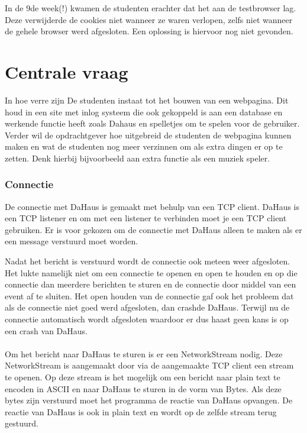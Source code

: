 \documentclass[11pt]{article}
\begin{document}
	In de 9de week(!) kwamen de studenten erachter dat het aan de testbrowser lag. Deze verwijderde de cookies niet wanneer ze waren verlopen, zelfs niet wanneer de gehele browser werd afgesloten. Een oplossing is hiervoor nog niet gevonden.
	
\newpage
	
	\section{Centrale vraag}
	In hoe verre zijn De studenten instaat tot het bouwen van een webpagina. Dit houd in een site met inlog systeem die ook gekoppeld is aan een database en werkende functie heeft zoals Dahaus en spelletjes om te spelen voor de gebruiker. Verder wil de opdrachtgever hoe uitgebreid de studenten de webpagina kunnen maken en wat de studenten nog meer verzinnen om als extra dingen er op te zetten. Denk hierbij bijvoorbeeld aan extra functie als een muziek speler. 
	

	
	\subsubsection{Connectie}
	
	De connectie met DaHaus is gemaakt met behulp van een TCP client. DaHaus is een TCP listener en om met een listener te verbinden moet je een TCP client gebruiken. Er is voor gekozen om de connectie met DaHaus alleen te maken als er een message verstuurd moet worden.
	
	Nadat het bericht is verstuurd wordt de connectie ook meteen weer afgesloten. Het lukte namelijk niet om een connectie te openen en open te houden en op die connectie dan meerdere berichten te sturen en de connectie door middel van een event af te sluiten. Het open houden van de connectie gaf ook het probleem dat als de connectie niet goed werd afgesloten, dan crashde DaHaus. Terwijl nu de connectie automatisch wordt afgesloten waardoor er dus haast geen kans is op een crash van DaHaus.
	\\
	\\
	Om het bericht naar DaHaus te sturen is er een NetworkStream nodig.
	Deze NetworkStream is aangemaakt door via de aangemaakte TCP client een stream te openen. Op deze stream is het mogelijk om een bericht naar plain text te encoden in ASCII en naar DaHaus te sturen in de vorm van Bytes. Als deze bytes zijn verstuurd moet het programma de reactie van DaHaus opvangen. De reactie van DaHaus is ook in plain text en wordt op de zelfde stream terug gestuurd.
	
\end{document}
